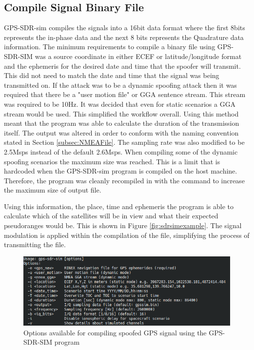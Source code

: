 \subsection{Compile Signal Binary File}
GPS-SDR-sim compiles the signals into a 16bit data format where the first 8bits represents the in-phase data and the next 8 bits represents the Quadrature data information.
The minimum requirements to compile a binary file using GPS-SDR-SIM was a source coordinate in either ECEF or latitude/longitude format and the ephemeris for the desired date and time that the spoofer
will transmit. This did not need to match the date and time that the signal was being transmitted on. If the attack was to be a dynamic spoofing attack then it was
required that there be a "user motion file" or GGA sentence stream. This stream was required to be 10Hz. It was decided that even for static scenarios a GGA stream would
be used. This simplified the workflow overall. Using this method meant that the program was able to calculate the duration of the transmission itself. The output was
altered in order to conform with the naming convention stated in Section \ref{subsec:NMEAFile}. The sampling rate was also modified to be 2.5Msps instead of the default
2.6Msps.
When compiling some of the dynamic spoofing scenarios the maximum size was reached. This is a limit that is hardcoded when the GPS-SDR-sim program is compiled on the host
machine. Therefore, the program was cleanly recompiled in with the command to increase the maximum size of output file.

Using this information, the place, time and ephemeris the program is able to calculate which of the satellites will be in view and what their expected pseudoranges would
be. This is shown in Figure \ref{fig:sdrsimexample}.
The signal modulation is applied within the compilation of the file, simplifying the process of transmitting the file. 

\begin{figure}[!ht]
    \begin{centering}
        \includegraphics[width=14cm,keepaspectratio]{Figures/gps-sdr-sim options.png}
        \caption{Options available for compiling spoofed GPS signal using the GPS-SDR-SIM program}
    \label{fig:sdrsimoptions}
    \end{centering}
\end{figure}

